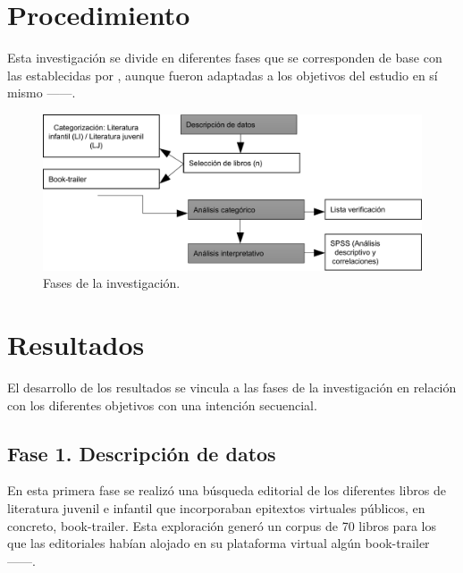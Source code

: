 \documentclass[spanish]{textolivre}
\begin{document}
\section{Procedimiento}
Esta investigación se divide en diferentes fases que se corresponden de base con las establecidas por \textcite{cambra2033}, aunque fueron adaptadas a los objetivos del estudio en sí mismo ——.

\begin{figure}[htbp]
\centering
\begin{minipage}{.8\textwidth}
 \includegraphics[width=\textwidth]{figure01.pdf}
 \caption{Fases de la investigación.}
 \label{fig01}
\end{minipage}
\end{figure}


\section{Resultados}
El desarrollo de los resultados se vincula a las fases de la investigación  en relación con los diferentes objetivos con una intención secuencial.

\subsection{Fase 1. Descripción de datos}
En esta primera fase se realizó una búsqueda editorial de los diferentes libros de literatura juvenil e infantil que incorporaban epitextos virtuales públicos, en concreto, book-trailer. Esta exploración generó un corpus de 70 libros para los que las editoriales habían alojado en su plataforma virtual algún book-trailer ——.
\end{document}
